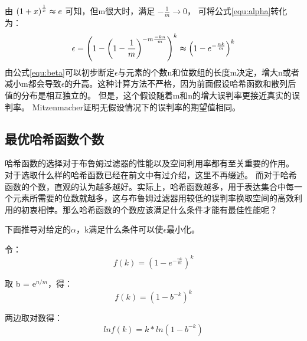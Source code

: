 由
\begin{math} \left(1 + x\right)^{\frac{1}{x}} \thickapprox e \end{math}
可知，但m很大时，满足
\begin{math}-\frac{1}{m} \to 0\end{math}，
可将公式\ref{equ:alpha}转化为：
\begin{equation}
\epsilon = \left(1 - \left(1 - \frac{1}{m}\right)^{{-m}\frac{-kn}{m}}\right)^k \thickapprox \left(1 - e^{-\frac{nk}{m}}\right)^k
\label{equ:beta}
\end{equation}
由公式\ref{equ:beta}可以初步断定\begin{math}\epsilon\end{math}与元素的个数n和位数组的长度m决定，增大n或者减小m都会导致\begin{math}\epsilon\end{math}的升高。这种计算方法不严格，因为前面假设哈希函数和散列后值的分布是相互独立的。
但是，这个假设随着m和n的增大误判率更接近真实的误判率。
Mitzenmacher证明无假设情况下的误判率的期望值相同\cite{mitzenmacher2002compressed}。

\subsection{最优哈希函数个数}
\label{sec:num_hashf}
哈希函数的选择对于布鲁姆过滤器的性能以及空间利用率都有至关重要的作用。
对于选取什么样的哈希函数已经在前文中有过介绍，这里不再缀述。
而对于哈希函数的个数，直观的认为越多越好。实际上，哈希函数越多，用于表达集合中每一个元素所需要的位数就越多，这与布鲁姆过滤器用较低的误判率换取空间的高效利用的初衷相悖。那么哈希函数的个数应该满足什么条件才能有最佳性能呢？

下面推导对给定的\begin{math}\alpha\end{math}，k满足什么条件可以使\begin{math}\epsilon\end{math}最小化。

令：
\begin{equation}
f\left(k\right) = \left(1 - e^{-\frac{nk}{m}}\right)^k 
\end{equation}

取 b = e$^{n/m}$，得：
\begin{equation}
f\left(k\right) = \left(1 - b^{-k}\right)^k 
\end{equation}

两边取对数得： 
\begin{equation}
lnf\left(k\right) = k\ast ln\left(1 - b^{-k}\right)
\end{equation}

